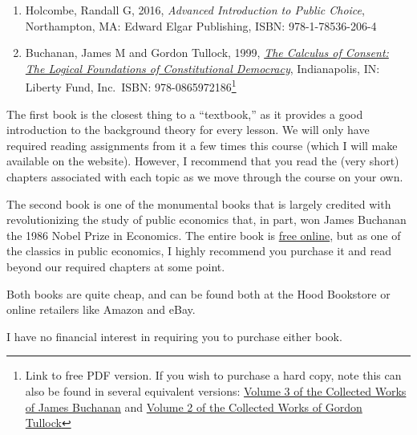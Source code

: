\documentclass{article}
\providecommand{\tightlist}{%
  \setlength{\itemsep}{0pt}\setlength{\parskip}{0pt}}
\begin{document}
\begin{enumerate}
\def\labelenumi{\arabic{enumi}.}
\tightlist
\item
  Holcombe, Randall G, 2016, \emph{Advanced Introduction to Public
  Choice}, Northampton, MA: Edward Elgar Publishing, ISBN:
  978-1-78536-206-4
\item
  Buchanan, James M and Gordon Tullock, 1999,
  \href{https://oll.libertyfund.org/titles/buchanan-the-calculus-of-consent-logical-foundations-of-constitutional-democracy}{\emph{The
  Calculus of Consent: The Logical Foundations of Constitutional
  Democracy}}, Indianapolis, IN: Liberty Fund, Inc.~ISBN:
  978-0865972186\footnote{Link to free PDF version. If you wish to
    purchase a hard copy, note this can also be found in several
    equivalent versions:
    \href{https://www.amazon.com/Calculus-Consent-Collected-Works-Buchanan/dp/0865972184}{Volume
    3 of the Collected Works of James Buchanan} and
    \href{https://www.amazon.com/Calculus-Consent-Selected-Gordon-Tullock/dp/0865975329/ref=pd_sbs_14_t_0/146-3613138-3597117?_encoding=UTF8\&pd_rd_i=0865975329\&pd_rd_r=d4b5a96a-f9bc-4afb-8820-a2dd881d9079\&pd_rd_w=sf42p\&pd_rd_wg=R2xmd\&pf_rd_p=5cfcfe89-300f-47d2-b1ad-a4e27203a02a\&pf_rd_r=H3W75RS4ZR4KCQH6H2G1\&psc=1\&refRID=H3W75RS4ZR4KCQH6H2G1}{Volume
    2 of the Collected Works of Gordon Tullock}}
\end{enumerate}

The first book is the closest thing to a ``textbook,'' as it provides a
good introduction to the background theory for every lesson. We will
only have required reading assignments from it a few times this course
(which I will make available on the website). However, I recommend that
you read the (very short) chapters associated with each topic as we move
through the course on your own.

The second book is one of the monumental books that is largely credited
with revolutionizing the study of public economics that, in part, won
James Buchanan the 1986 Nobel Prize in Economics. The entire book is
\href{https://oll.libertyfund.org/titles/buchanan-the-calculus-of-consent-logical-foundations-of-constitutional-democracy}{free
online}, but as one of the classics in public economics, I highly
recommend you purchase it and read beyond our required chapters at some
point.

Both books are quite cheap, and can be found both at the Hood Bookstore
or online retailers like Amazon and eBay.

I have no financial interest in requiring you to purchase either book.
\end{document}
